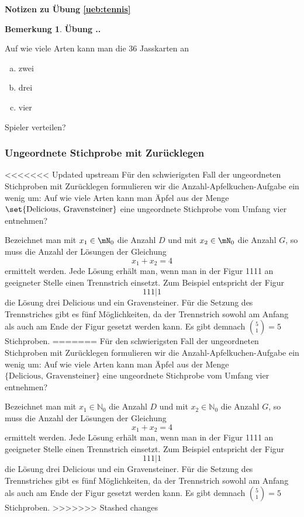 \documentclass[%
<<<<<<< Updated upstream
11pt,%
twoside,%
titlepage,%
german,%
=======
11pt,%
twoside,%
titlepage,%
swissgerman,%
>>>>>>> Stashed changes
headsepline%
]{scrartcl}
\newcommand{\faEyeLightGray}{\textcolor{lightgray}{\faEye}} %
\newcommand{\faReturnGray}{\textcolor{gray}{\faMailReply}} %
\newcommand{\faEyeLightGray}{\textcolor{lightgray}{\faEye}} %
\theoremstyle{definition}
\newtheorem{bem}{Bemerkung}[subsection] %
\theoremstyle{plain}
\newcommand{\concatueb}[1]{ueb:#1}%
\newcommand{\concatlsg}[1]{lsg:#1}%
\newcounter{uebcounter}[section]
\renewcommand{\theuebcounter}{\thesection.\arabic{uebcounter}}  %
\newenvironment{lsg}[1]{%
    \par\noindent\textbf{Notizen zu Übung \ref{\concatueb{#1}}}\label{\concatlsg{#1}}
    \hfill\hyperref[\concatueb{#1}]{\faReturnGray}\par %
}{%
    \par%
}
\newenvironment{uebenv}[1]{%
    \refstepcounter{uebcounter}
    \par\noindent\textbf{Übung \theuebcounter.}%
    \label{\concatueb{#1}}\hfill\hyperref[\concatlsg{#1}]{\faEyeLightGray}\par
}{%
    \par
}
\newcounter{theo}[section]\setcounter{theo}{0}
\newcommand{\concatueb}[1]{ueb:#1}%
\newcommand{\concatlsg}[1]{lsg:#1}%
\newcounter{uebcounter}[section]
\renewcommand{\theuebcounter}{\thesection.\arabic{uebcounter}}  %
\newenvironment{lsg}[1]{%
    \par\noindent\textbf{Notizen zu Übung \ref{\concatueb{#1}}.}%
    \label{\concatlsg{#1}}
}{%
    \par%
}
\newenvironment{uebenv}[1]{%
    \refstepcounter{uebcounter}
    \par\noindent\textbf{Übung \theuebcounter.}%
    \label{\concatueb{#1}}\hfill\hyperref[\concatlsg{#1}]{\faEyeLightGray}\newline
}{%
    \par
}
\begin{document}
\begin{lsg}{tennis}
\begin{bem}
\begin{uebenv}{jass}
Auf wie viele Arten kann man die 36 Jasskarten an

\begin{enumerate}[a)]
\item zwei
\item drei
\item vier
\end{enumerate}

Spieler verteilen?
\end{uebenv}




\subsubsection{Ungeordnete Stichprobe mit Zurücklegen}
<<<<<<< Updated upstream
Für den schwierigsten Fall der ungeordneten Stichproben mit Zurücklegen formulieren wir die Anzahl-Apfelkuchen-Aufgabe ein wenig um: Auf wie viele Arten kann man \"Apfel aus der Menge $\set{\text{Delicious, Gravensteiner}}$ eine ungeordnete Stichprobe vom Umfang vier entnehmen?

Bezeichnet man mit $x_1\in\mN_0$ die Anzahl $D$ und mit $x_2\in\mN_0$ die Anzahl $G$, so muss die Anzahl der Lösungen der Gleichung $$x_1+x_2=4$$ ermittelt werden. Jede Lösung erhält man, wenn man in der Figur 1111 an geeigneter Stelle einen Trennstrich einsetzt. Zum Beispiel entspricht der Figur $$111|1$$ die Lösung drei Delicious und ein Gravensteiner. Für die Setzung des Trennstriches gibt es fünf Möglichkeiten, da der Trennstrich sowohl am Anfang als auch am Ende der Figur gesetzt werden kann. Es gibt demnach $\binom{5}{1}=5$ Stichproben.
=======
Für den schwierigsten Fall der ungeordneten Stichproben mit Zurücklegen formulieren wir die Anzahl-Apfelkuchen-Aufgabe ein wenig um: Auf wie viele Arten kann man \"Apfel aus der Menge $\{\text{Delicious, Gravensteiner}\}$ eine ungeordnete Stichprobe vom Umfang vier entnehmen?

Bezeichnet man mit $x_1\in\mathbb{N}_0$ die Anzahl $D$ und mit $x_2\in\mathbb{N}_0$ die Anzahl $G$, so muss die Anzahl der Lösungen der Gleichung $$x_1+x_2=4$$ ermittelt werden. Jede Lösung erhält man, wenn man in der Figur 1111 an geeigneter Stelle einen Trennstrich einsetzt. Zum Beispiel entspricht der Figur $$111|1$$ die Lösung drei Delicious und ein Gravensteiner. Für die Setzung des Trennstriches gibt es fünf Möglichkeiten, da der Trennstrich sowohl am Anfang als auch am Ende der Figur gesetzt werden kann. Es gibt demnach $\binom{5}{1}=5$ Stichproben.
>>>>>>> Stashed changes


\end{bem}
\end{lsg}
\end{document}
